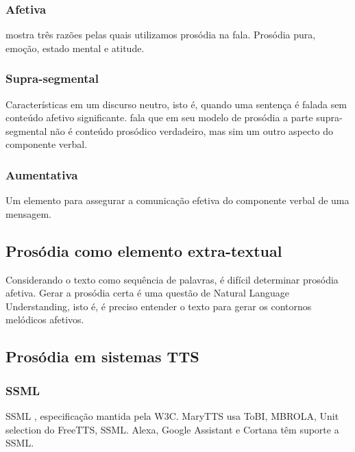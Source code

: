 \subsubsection{Afetiva}
 mostra três razões pelas quais utilizamos prosódia na fala.
Prosódia pura, emoção, estado mental e atitude. 
\subsubsection{Supra-segmental}
Características em um discurso neutro, isto é, quando uma sentença é falada sem
conteúdo afetivo significante.  fala que em seu modelo de
prosódia a parte supra-segmental não é conteúdo prosódico verdadeiro, mas sim
um outro aspecto do componente verbal.
\subsubsection{Aumentativa}
Um elemento para assegurar a comunicação efetiva do componente verbal de uma mensagem.
\subsection{Prosódia como elemento extra-textual}
Considerando o texto como sequência de palavras, é difícil determinar prosódia
afetiva.
Gerar a prosódia certa é uma questão de Natural Language Understanding, isto é,
é preciso entender o texto para gerar os contornos melódicos afetivos.

\subsection{Prosódia em sistemas TTS}
\subsubsection{SSML}
SSML \cite{SSML}, especificação mantida pela W3C.
MaryTTS usa ToBI, MBROLA, Unit selection do FreeTTS, SSML.
Alexa, Google Assistant e Cortana têm suporte a SSML.
